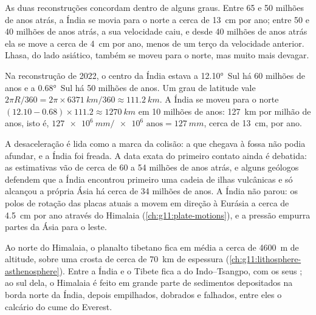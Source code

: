 As duas reconstruções concordam dentro de alguns graus. Entre 65 e 50
milhões de anos atrás, a Índia se movia para o norte a cerca de \qty{13}{cm}
por ano; entre 50 e 40 milhões de anos atrás, a sua velocidade caiu, e
desde 40 milhões de anos atrás ela se move a cerca de \qty{4}{cm} por ano,
menos de um terço da velocidade anterior. Lhasa, do lado asiático, também se
moveu para o norte, mas muito mais devagar.

\begin{example}\label{ex:g12:mountain-building:india}
Na reconstrução de 2022, o centro da Índia estava a \ang{12.10}~Sul há 60
milhões de anos e a \ang{0.68}~Sul há 50 milhões de anos. Um grau de
latitude vale
$2\pi R/360 = 2\pi \times \qty{6371}{km}/360 \approx \qty{111.2}{km}$. A Índia se moveu para o norte
$(12.10 - 0.68) \times 111.2 \approx \qty{1270}{km}$ em 10 milhões de anos: \qty{127}{km} por milhão de
anos, isto é, $\qty{127e6}{mm} /
\num{e6}\text{ anos} = \qty{127}{mm}$, cerca de \qty{13}{cm}, por ano.
\end{example}

A desaceleração é lida como a marca da colisão: a  que
chegava à fossa não podia afundar, e a Índia foi freada. A data exata do
primeiro contato ainda é debatida: as estimativas vão de cerca de 60 a 54
milhões de anos atrás, e alguns geólogos defendem que a Índia encontrou
primeiro uma cadeia de ilhas vulcânicas e só alcançou a própria Ásia há
cerca de 34 milhões de anos. A Índia não parou: os polos de rotação das
placas atuais a movem em direção à Eurásia a cerca de \qty{4.5}{cm} por ano
através do Himalaia (\cref{ch:g11:plate-motions}), e a pressão empurra
partes da Ásia para o leste.

Ao norte do Himalaia, o planalto tibetano fica em média a cerca de
\qty{4600}{m} de altitude, sobre uma crosta de cerca de \qty{70}{km} de
espessura (\cref{ch:g11:lithosphere-asthenosphere}). Entre a Índia e o
Tibete fica a  do Indo--Tsangpo, com os seus ; ao sul dela, o
Himalaia é feito em grande parte de sedimentos depositados na borda norte da
Índia, depois empilhados, dobrados e falhados, entre eles o calcário do cume
do Everest.

